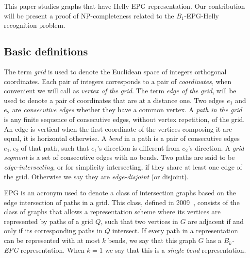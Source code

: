 \documentclass[a4paper,11pt]{article}
\begin{document}
This paper studies graphs that have Helly EPG representation. Our contribution will be present a proof of NP-completeness related to the $ B_1$-EPG-Helly recognition problem.%

 
 
 \subsection{Basic definitions}


The term \emph{grid} is used to denote the Euclidean space of integers orthogonal coordinates. Each pair of integers corresponds to a pair of \emph{coordinates},  when convenient we will call as \emph {vertex of the grid}. The term \emph{edge of the grid}, will be used to denote a pair of coordinates that are at a distance one. Two edges $e_1$ and $e_2$ are \emph{consecutive edges} whether they have a common vertex. %
A \emph{path in the grid} is any finite sequence of consecutive edges, without vertex repetition, of the grid.
An edge is vertical when the first coordinate of the vertices composing it are equal, it is horizontal otherwise. A \emph {bend} in a path is a pair of consecutive edges $ e_1, e_2 $ of that path, such that $ e_1$'s direction is different from $ e_2$'s direction. A \emph {grid segment} is a set of consecutive edges with no bends. %
Two paths are said to be \emph{edge-intersecting}, or for simplicity  intersecting, if they share at least one edge of the grid. Otherwise we say they are \emph{edge-disjoint} (or disjoint).

EPG is an acronym used to denote a class of intersection graphs based on the edge intersection of paths in a grid. This class, defined in 2009~\citep{golumbic2009}, consists of the class of graphs that allows a representation scheme where its vertices are represented by paths of a grid $ Q $, such that two vertices in $ G $ are adjacent if and only if its corresponding paths in $ Q $ intersect. If every path in a representation can be represented with at most $ k $ bends, we say that this graph $ G $ has a \emph{ $ B_k$-EPG} representation.%
When $ k = 1 $ we say that this is a \emph{single bend} representation.
\end{document}
